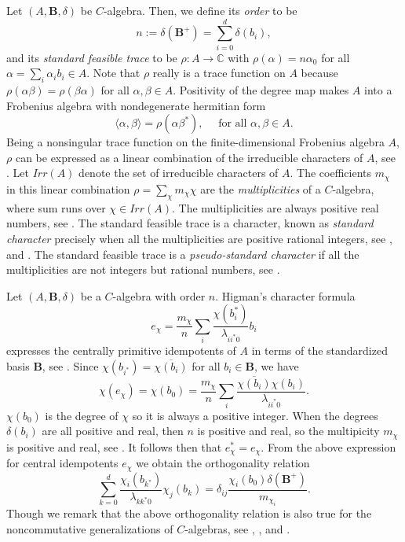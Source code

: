 \documentclass[12pt]{amsart}
\begin{document}
\smallskip

Let $(A,\mathbf{B}, \delta)$ be $C$-algebra. Then, we define its {\it order} to be
$$ n := \delta(\mathbf{B}^+) = \sum_{i=0}^d \delta(b_i), $$
and its {\it standard feasible trace} to be $\rho: A \rightarrow \mathbb{C}$ with $\rho(\alpha) = n \alpha_0$ for all $\alpha = \sum_i \alpha_i b_i \in A$.  Note that $\rho$ really is a trace function on $A$ because $\rho(\alpha\beta)=\rho(\beta\alpha)$ for all $\alpha, \beta \in A$.    Positivity of the degree map makes $A$ into a Frobenius algebra with nondegenerate hermitian form
$$ \langle \alpha, \beta \rangle = \rho(\alpha \beta^*), \quad \mbox{ for all } \alpha,\beta \in A. $$
Being a nonsingular trace function on the finite-dimensional Frobenius algebra $A$, $\rho$ can be expressed as a  linear combination of the irreducible characters of $A$, see \cite{Hig87}.  Let $Irr(A)$ denote the set of irreducible characters of $A$. The coefficients $m_{\chi}$ in this linear combination $\rho = \sum_{\chi} m_{\chi} \chi$ are the {\it multiplicities} of a $C$-algebra, where sum runs over $\chi \in Irr(A)$. The multiplicities are always positive real numbers, see \cite{HIB2}.
The standard feasible trace is a character, known as \emph{standard character} precisely when all the multiplicities are positive rational integers, see \cite{JA}, \cite{HIB2} and  \cite{HS2}. The standard feasible trace is a \emph{pseudo-standard character} if all the multiplicities are not integers but rational numbers, see \cite{HSnew2}.

\smallskip

Let $(A,\mathbf{B},\delta)$ be a $C$-algebra with order $n$.  Higman's character formula
$$ e_{\chi} = \frac{m_{\chi}}{n} \sum_i \frac{\chi(b_i^*)}{\lambda_{ii^*0}}b_i $$
expresses the centrally primitive idempotents of $A$ in terms of the standardized basis $\mathbf{B}$, see  \cite{Hig87}.
Since $\chi(b_{i^*})=\overline{\chi(b_i)}$ for all $b_i \in \mathbf{B}$, we have
$$\chi(e_{\chi}) = \chi(b_0) = \frac{m_{\chi}}{n}\sum_i \frac{\overline{\chi(b_i)}\chi(b_i)}{\lambda_{ii^*0}}.$$
$\chi(b_0)$ is the degree of $\chi$ so it is always a positive integer.  When the degrees $\delta(b_i)$ are all positive and real, then $n$ is positive and real, so the multipicity $m_{\chi}$ is positive and real, see \cite{HIB1}.   It follows then that $e_{\chi}^* = e_{\chi}$.
From the above expression for central idempotents $e_\chi$ we obtain the   orthogonality relation \cite{Hig87}
$$\sum\limits_{k=0}^d \frac{\chi_i(b_{k^*})}{\lambda_{kk^*0}}\chi_j(b_k)=\delta_{ij}\frac {\chi_i(b_0)\delta({{\mathbf B}}^+)}{m_{\chi_i}}.$$
Though we remark that the above orthogonality relation is also true for the noncommutative generalizations of $C$-algebras, see \cite{AFM},  \cite{HSnew1}, \cite{Hig87} and \cite{G1}.
\end{document}
